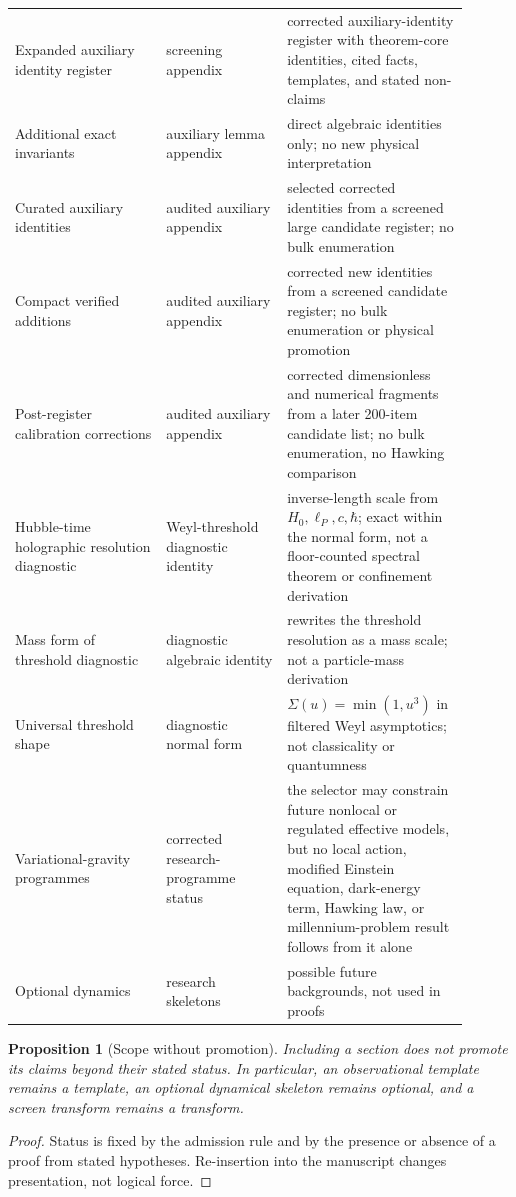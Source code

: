 \documentclass[11pt,a4paper]{article}
\newtheorem{proposition}[theorem]{Proposition}
\begin{document}
{\begin{longtable}{p{0.30\linewidth}p{0.24\linewidth}p{0.36\linewidth}}
Expanded auxiliary identity register & screening appendix & corrected auxiliary-identity register with theorem-core identities, cited facts, templates, and stated non-claims\\
Additional exact invariants & auxiliary lemma appendix & direct algebraic identities only; no new physical interpretation\\
Curated auxiliary identities & audited auxiliary appendix & selected corrected identities from a screened large candidate register; no bulk enumeration\\
Compact verified additions & audited auxiliary appendix & corrected new identities from a screened candidate register; no bulk enumeration or physical promotion\\
Post-register calibration corrections & audited auxiliary appendix & corrected dimensionless and numerical fragments from a later 200-item candidate list; no bulk enumeration, no Hawking comparison\\
Hubble-time holographic resolution diagnostic & Weyl-threshold diagnostic identity & inverse-length scale from \(H_0,\ell_P,c,\hbar\); exact within the normal form, not a floor-counted spectral theorem or confinement derivation\\
Mass form of threshold diagnostic & diagnostic algebraic identity & rewrites the threshold resolution as a mass scale; not a particle-mass derivation\\
Universal threshold shape & diagnostic normal form & \(\Sigma(u)=\min(1,u^3)\) in filtered Weyl asymptotics; not classicality or quantumness\\
Variational-gravity programmes & corrected research-programme status & the selector may constrain future nonlocal or regulated effective models, but no local action, modified Einstein equation, dark-energy term, Hawking law, or millennium-problem result follows from it alone\\
Optional dynamics & research skeletons & possible future backgrounds, not used in proofs\\
\bottomrule
\end{longtable}
}

\begin{proposition}[Scope without promotion]
Including a section does not promote its claims beyond their stated status.  In particular, an observational template remains a template, an optional dynamical skeleton remains optional, and a screen transform remains a transform.
\end{proposition}
\begin{proof}
Status is fixed by the admission rule and by the presence or absence of a proof from stated hypotheses.  Re-insertion into the manuscript changes presentation, not logical force.
\end{proof}
\end{document}
